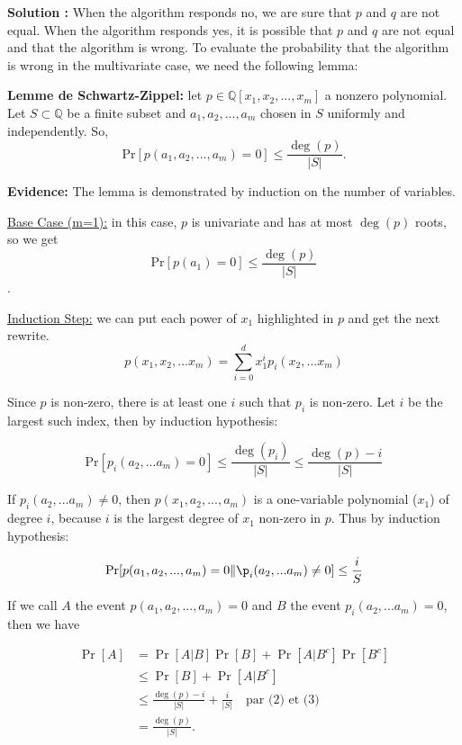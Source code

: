 \documentclass[11pt]{article} %
\newenvironment{solution}[1][\unskip]{%
	\par
	\noindent
	\textbf{Solution #1:}
	\noindent}
{\medskip}
\begin{document}
\begin{solution}
		When the algorithm responds no, we are sure that $ p $ and $ q $ are not equal. When the algorithm responds yes, it is possible that $ p $ and $ q $ are not equal and that the algorithm is wrong. To evaluate the probability that the algorithm is wrong in the multivariate case, we need the following lemma:
		
		\textbf{Lemme de Schwartz-Zippel:} let $ p \in \mathbb{Q} [x_1, x_2, ..., x_m] $ a nonzero polynomial. Let $ S \subset \mathbb{Q} $ be a finite subset and $ a_1, a_2, ..., a_m $ chosen in $ S $ uniformly and independently. So,
		\begin{equation}
		\label{lemme}
		\text{Pr}[p(a_1,a_2,...,a_m)=0]\leq \frac{\deg(p)}{|S|}.
		\end{equation}
		
		\textbf{Evidence:} The lemma is demonstrated by induction on the number of variables.
		
		\underline{Base Case (m=1):} in this case, $ p $ is univariate and has at most $ \deg (p) $ roots, so we get $$ \text {Pr} [p (a_1) = 0] \leq \frac{\deg (p )}{|S|} $$.
		
		\underline{Induction Step:} we can put each power of $ x_1 $ highlighted in $ p $ and get the next rewrite.
        $$ p (x_1, x_2, ... x_m) = \sum_{i=0}^d x_1^ip_i (x_2, ... x_m) $$

		Since $ p $ is non-zero, there is at least one $ i $ such that $ p_i $ is non-zero. Let $ i $ be the largest such index, then by induction hypothesis:		
		
		\begin{equation}
		\text{Pr}[p_i(a_2,...a_m)=0] \leq \frac{\deg(p_i)}{|S|} \leq \frac{\deg(p) - i}{|S|}
		\end{equation}
		
		If $ p_i (a_2, ... a_m) \neq 0 $, then $ p (x_1, a_2, ..., a_m) $ is a one-variable polynomial ($ x_1 $) of degree $ i $, because $ i $ is the largest degree of $ x_1 $ non-zero in $ p $. Thus by induction hypothesis:
		
		\begin{equation}
		\text{Pr}[p(a_1,a_2,...,a_m) = 0 \| \p_i(a_2,...a_m)\neq 0] \leq \frac{i}{S}
		\end{equation}
		
		If we call $ A $ the event $ p (a_1, a_2, ..., a_m) = 0 $ and $ B $ the event $ p_i (a_2, ... a_m) = 0 $, then we have
		
		\begin{align*}
		\Pr[A] &= \Pr[A|B]\Pr[B] + \Pr[A|B^c]\Pr[B^c]\\
		&\leq \Pr[B] + \Pr[A|B^c]\\
		&\leq \frac{\deg(p)-i}{|S|}+\frac{i}{|S|} \quad \text{par (2) et (3)}\\
		&=\frac{\deg(p)}{|S|}.
		\end{align*}
		

\end{solution}
\end{document}
